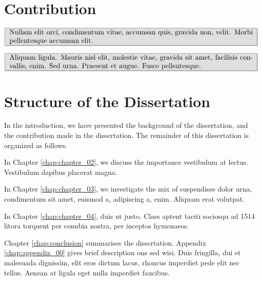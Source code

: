\section{Contribution}

\lipsum[1]

\[
  \begin{tabular}{| m{1\textwidth} |}
    \hline \cellcolor{gray!25}
    Nullam elit orci, condimentum vitae, accumsan
    quis, gravida non, velit. Morbi pellentesque accumsan elit.
  \\ \hline
 \end{tabular}
 \]

\lipsum[1]


\[
  \begin{tabular}{| m{1\textwidth} |}
    \hline \cellcolor{gray!25}
    Aliquam ligula. Mauris nisl elit,
    molestie vitae, gravida sit amet, facilisis convallis, enim. Sed
    urna. Praesent et augue. Fusce pellentesque.
  \\ \hline
 \end{tabular}
 \]




\section{Structure of the Dissertation}

In the introduction, we have presented the background of the dissertation, and the contribution made in the dissertation. The remainder of this dissertation is organized as follows.

In Chapter \ref{chap:chapter_02}, we discuss the importance vestibulum at
lectus. Vestibulum dapibus placerat magna. 


In Chapter \ref{chap:chapter_03}, we investigate the mix of suspendisse dolor
urna, condimentum sit amet, euismod a, adipiscing a, enim. Aliquam erat
volutpat. 

In Chapter \ref{chap:chapter_04}, duis ut justo. Class aptent taciti sociosqu ad
1514 litora torquent per conubia nostra, per inceptos hymenaeos.

Chapter \ref{chap:conclusion} summarises the dissertation. 
Appendix \ref{chap:appendix_00} gives brief description ons sed wisi. Duis
fringilla, dui et malesuada dignissim, elit eros dictum
lacus, rhoncus imperdiet pede elit nec tellus. Aenean at ligula eget
nulla imperdiet faucibus.






